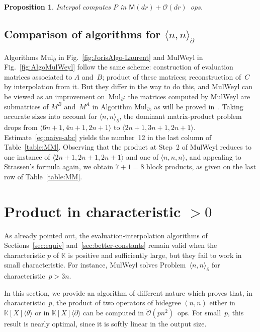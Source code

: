 \documentclass{sig-alt-full}
\newcommand{\x}{X}
\newcommand{\Tx}{\theta}
\newcommand{\Dx}{\partial}
\newcommand{\bigO}{{\mathcal{O}}}
\newcommand{\bigOsoft}{\tilde{\mathcal{O}}}
\def\OMul#1#2#3{\langle #1,#2 \rangle_{#3}}
\def\MMul#1#2#3{\langle #1,#2,#3 \rangle}
\newcommand{\sM}{\mathsf{M}}
\newcommand{\bK}{\mathbb{K}}
\newtheorem{proposition}{Proposition}
\begin{document}
\begin{proposition}\label{prop:Interpol}
\textsf{Interpol} computes $P$ in $\sM(dr)+\bigO(dr)$~ops.
\end{proposition}


\subsection{Comparison of algorithms for $\OMul nn\Dx$}

Algorithms \textsf{Mul}$_\Dx$ in Fig.~\ref{fig:JorisAlgo-Laurent} and \textsf{MulWeyl} in Fig.~\ref{fig:AlgoMulWeyl} follow the same scheme:
construction of evaluation matrices associated to $A$ and~$B$; product of these matrices; reconstruction of~$C$ by interpolation from it.
But they  differ in the way to do this, and \textsf{MulWeyl} can be viewed as an improvement on~\textsf{Mul}$_\Dx$:
the matrices computed by \textsf{MulWeyl} are submatrices of $M^B$ and~$M^A$ in Algorithm \textsf{Mul}$_\Dx$, as will be proved in~\cite{LongVersion}.
Taking accurate sizes into account for $\OMul nn\Dx$, the dominant matrix-product problem drops from $\MMul {6n+1}{4n+1}{2n+1}$ to $\MMul {2n+1}{3n+1}{2n+1}$.
Estimate~\eqref{eq:naive-abc} yields the number~12 in the last column of Table~\ref{table:MM}.
Observing that the product at Step~2 of \textsf{MulWeyl} reduces to one instance of $\MMul {2n+1} {2n+1} {2n+1}$ and one of $\MMul{n}{n}{n}$, and appealing to Strassen's formula again, we obtain $7+1=8$ block products, as given on the last row of Table~\ref{table:MM}.


\section{Product in characteristic ${}>0$}
\label{sec:positive-char}

As already pointed out, the evaluation-interpolation algorithms of  Sections~\ref{sec:equiv} and~\ref{sec:better-constants} remain valid when the characteristic $p$ of $\bK$ is positive and sufficiently large, but they fail to work in small characteristic.
For instance, \textsf{MulWeyl} solves Problem~$\OMul nn\Dx$ for characteristic~$p > 3n$.

In this section, we provide an algorithm of different nature which proves that, in characteristic~$p$, the product of two operators of bidegree $(n,n)$ either in $\bK[\x]\langle\Tx\rangle$ or in $\bK[\x]\langle\Dx\rangle$ can be computed in $\bigOsoft(p n^2)$~ops.
For small~$p$, this result is nearly optimal, since it is softly linear in the output size.
\end{document}

